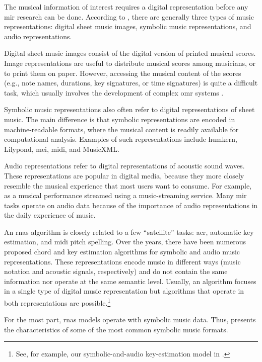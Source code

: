 


The musical information of interest requires a digital
representation before any \gls{mir} research can be done.
According to \textcite{muller2015music}, there are generally
three types of music representations: digital sheet music
images, symbolic music representations, and audio
representations.

Digital sheet music images consist of the digital version of
printed musical scores. Image representations are useful to
distribute musical scores among musicians, or to print them
on paper. However, accessing the musical content of the
scores (e.g., note names, durations, key signatures, or time
signatures) is quite a difficult task, which usually
involves the development of complex \gls{omr} systems
\parencite{calvozaragoza2020understanding}.

Symbolic music representations also often refer to digital
representations of sheet music. The main difference is that
symbolic representations are encoded in machine-readable
formats, where the musical content is readily available for
computational analysis. Examples of such representations
include \gls{humkern}, Lilypond, \gls{mei}, \gls{midi}, and
MusicXML.

Audio representations refer to digital representations of
acoustic sound waves. These representations are popular in
digital media, because they more closely resemble the
musical experience that most users want to consume. For
example, as a musical performance streamed using a
music-streaming service. Many \gls{mir} tasks operate on
audio data because of the importance of audio
representations in the daily experience of music.

An \glspl{rna} algorithm is closely related to a few
``satellite'' tasks: \gls{acr}, automatic key estimation,
and \gls{midi} pitch spelling. Over the years, there have
been numerous proposed chord and key estimation algorithms
for symbolic and audio music representations. These
representations encode music in different ways (music
notation and acoustic signals, respectively) and do not
contain the same information nor operate at the same
semantic level. Usually, an algorithm focuses in a single
type of digital music representation but algorithms that
operate in both representations are possible.\footnote{See,
for example, our symbolic-and-audio key-estimation model in
\textcite{napoleslopez2019keyfinding}.}

For the most part, \glspl{rna} models operate with symbolic
music data. Thus,  presents
the characteristics of some of the most common symbolic
music formats. 

